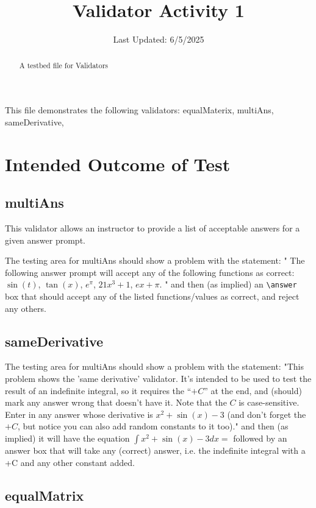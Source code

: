 \documentclass{ximera}
\title{Validator Activity 1}
\date{Last Updated: 6/5/2025}
\begin{document}
\begin{abstract}
    A testbed file for Validators
\end{abstract}
\maketitle

This file demonstrates the following validators: equalMaterix, multiAns, sameDerivative, 

\section{Intended Outcome of Test}

    \subsection*{multiAns}
        This validator allows an instructor to provide a list of acceptable answers for a given answer prompt.

        The testing area for multiAns should show a problem with the statement: 
        " The following answer prompt will accept any of the following functions as correct: $\sin(t)$, $\tan(x)$, $e^\pi$, $21x^3 + 1$, $ex + \pi$. "
        and then (as implied) an \verb|\answer| box that should accept any of the listed functions/values as correct, and reject any others.

    \subsection*{sameDerivative}
        The testing area for multiAns should show a problem with the statement: 
        "This problem shows the 'same derivative' validator. It's intended to be used to test the result of an indefinite integral, so it requires the ``$+C$'' at the end, and (should) mark any answer wrong that doesn't have it. Note that the $C$ is case-sensitive. \\
            
            Enter in any answer whose derivative is $x^2 + \sin(x) - 3$ (and don't forget the $+C$, but notice you can also add random constants to it too)."
        and then (as implied) it will have the equation $\int x^2 + \sin(x) - 3 dx =$ followed by an answer box that will take any (correct) answer, i.e. the 
        indefinite integral with a +C and any other constant added.

    \subsection*{equalMatrix}
\end{document}
